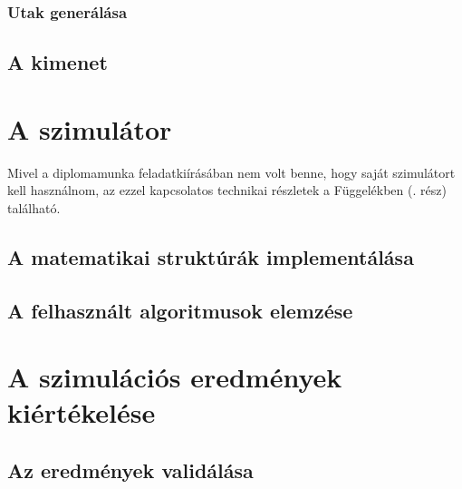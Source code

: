       \subsubsection{Utak generálása}
    \subsection{A kimenet}

  \section{A szimulátor} %
  Mivel a diplomamunka feladatkiírásában nem volt benne, hogy saját szimulátort kell használnom, az ezzel kapcsolatos technikai részletek a Függelékben (. rész) található.\\
    \subsection{A matematikai struktúrák implementálása}
    \subsection{A felhasznált algoritmusok elemzése}

  \section{A szimulációs eredmények kiértékelése} %
    \subsection{Az eredmények validálása}
